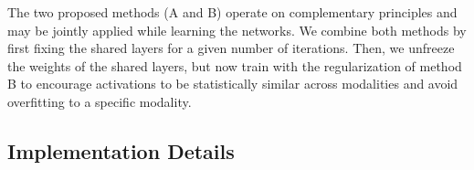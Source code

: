 \documentclass[10pt,journal,compsoc]{IEEEtran}
\begin{document}

    The two proposed methods (A and B) operate on complementary principles and may be jointly applied while learning the networks. We combine both methods by first fixing the shared layers for a given number of iterations. Then, we unfreeze the weights of the shared layers, but now train with the regularization of method B to encourage activations to be statistically similar across modalities and avoid overfitting to a specific modality. 

    \subsection{Implementation Details}
\end{document}
